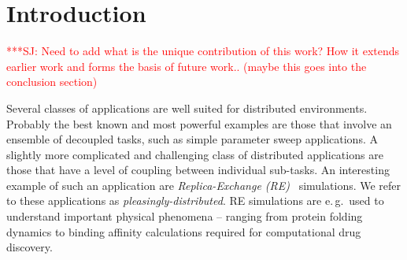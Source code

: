 \documentclass{rspublic}
\newcommand{\alnote}[1]{ {\textcolor{blue} { ***AL: #1 }}}
\newcommand{\jhanote}[1]{ {\textcolor{red} { ***SJ: #1 }}}
\newcommand{\alnote}[1]{}
\newcommand{\jhanote}[1]{}
\begin{document}
\begin{abstract}{Replica-Exchange, SAGA, Migol, Fault Tolerance}
  \jhanote{In this paper, we describe the design, development and
    deployment of a unique framework for constructing fault-tolerant
    distributed simulations.}

  \jhanote{Less emphasis on the SAGA/Migol framework: The framework
    consists of two primary components -- SAGA and Migol, is scalable,
    general purpose and extensible.}

  \jhanote{I think this can go: We provide details of a newly
    developed functionality in SAGA -- the Checkpoint and Recovery
    API. Migol is an adaptive Grid middleware, which addresses the
    fault tolerance of Grid applications and services by providing the
    capability to recover applications from checkpoint files
    transparently.  In addition to describing the integration of
    SAGA-CPR with the Migol infrastructure,}
  \alnote{I added a small note about Migol to the abstract (I tried to keep
    it short.)}

  \jhanote{We also outline our experiences with running a large scale,
    general-purpose, SAGA-CPR based Replica-Exchange application in a
    production distributed environment.}

\end{abstract}

\section{Introduction}

\jhanote{Need to add what is the unique contribution of this work? How
  it extends earlier work and forms the basis of future work.. (maybe
  this goes into the conclusion section)}

Several classes of applications are well suited for distributed
environments. Probably the best known and most powerful examples are
those that involve an ensemble of decoupled tasks, such as simple
parameter sweep applications.  A slightly more complicated and
challenging class of distributed applications are those that have a
level of coupling between individual sub-tasks.  An interesting
example of such an application are \emph{Replica-Exchange
  (RE)}~\citep{hansmann,Sugita:1999rm} simulations.
We refer to these applications as {\it pleasingly-distributed}. RE simulations
are e.\,g.\ used to understand important physical phenomena -- ranging from
protein folding dynamics to binding affinity calculations required for
computational drug discovery.
  
\end{document}

